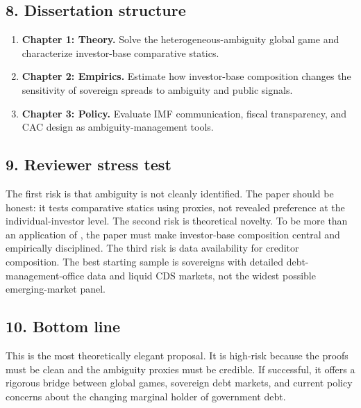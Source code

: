 \documentclass[11pt]{article}
\begin{document}
\subsection*{8. Dissertation structure}
\begin{enumerate}[leftmargin=*]
\item \textbf{Chapter 1: Theory.} Solve the heterogeneous-ambiguity global game and characterize investor-base comparative statics.
\item \textbf{Chapter 2: Empirics.} Estimate how investor-base composition changes the sensitivity of sovereign spreads to ambiguity and public signals.
\item \textbf{Chapter 3: Policy.} Evaluate IMF communication, fiscal transparency, and CAC design as ambiguity-management tools.
\end{enumerate}

\subsection*{9. Reviewer stress test}
The first risk is that ambiguity is not cleanly identified. The paper should be honest: it tests comparative statics using proxies, not revealed preference at the individual-investor level. The second risk is theoretical novelty. To be more than an application of \citet{Ui2025}, the paper must make investor-base composition central and empirically disciplined. The third risk is data availability for creditor composition. The best starting sample is sovereigns with detailed debt-management-office data and liquid CDS markets, not the widest possible emerging-market panel.

\subsection*{10. Bottom line}
This is the most theoretically elegant proposal. It is high-risk because the proofs must be clean and the ambiguity proxies must be credible. If successful, it offers a rigorous bridge between global games, sovereign debt markets, and current policy concerns about the changing marginal holder of government debt.


\newpage
\printbibliography
\end{document}

